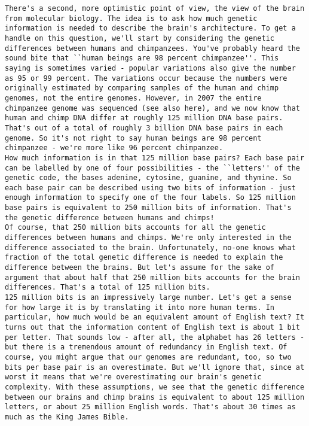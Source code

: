 \begin{lstlisting}
There's a second, more optimistic point of view, the view of the brain from molecular biology. The idea is to ask how much genetic information is needed to describe the brain's architecture. To get a handle on this question, we'll start by considering the genetic differences between humans and chimpanzees. You've probably heard the sound bite that ``human beings are 98 percent chimpanzee''. This saying is sometimes varied - popular variations also give the number as 95 or 99 percent. The variations occur because the numbers were originally estimated by comparing samples of the human and chimp genomes, not the entire genomes. However, in 2007 the entire chimpanzee genome was sequenced (see also here), and we now know that human and chimp DNA differ at roughly 125 million DNA base pairs. That's out of a total of roughly 3 billion DNA base pairs in each genome. So it's not right to say human beings are 98 percent chimpanzee - we're more like 96 percent chimpanzee.
How much information is in that 125 million base pairs? Each base pair can be labelled by one of four possibilities - the ``letters'' of the genetic code, the bases adenine, cytosine, guanine, and thymine. So each base pair can be described using two bits of information - just enough information to specify one of the four labels. So 125 million base pairs is equivalent to 250 million bits of information. That's the genetic difference between humans and chimps!
Of course, that 250 million bits accounts for all the genetic differences between humans and chimps. We're only interested in the difference associated to the brain. Unfortunately, no-one knows what fraction of the total genetic difference is needed to explain the difference between the brains. But let's assume for the sake of argument that about half that 250 million bits accounts for the brain differences. That's a total of 125 million bits.
125 million bits is an impressively large number. Let's get a sense for how large it is by translating it into more human terms. In particular, how much would be an equivalent amount of English text? It turns out that the information content of English text is about 1 bit per letter. That sounds low - after all, the alphabet has 26 letters - but there is a tremendous amount of redundancy in English text. Of course, you might argue that our genomes are redundant, too, so two bits per base pair is an overestimate. But we'll ignore that, since at worst it means that we're overestimating our brain's genetic complexity. With these assumptions, we see that the genetic difference between our brains and chimp brains is equivalent to about 125 million letters, or about 25 million English words. That's about 30 times as much as the King James Bible.

\end{lstlisting}
